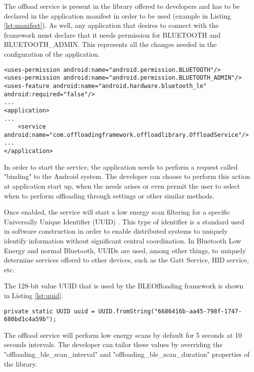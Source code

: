 The offload service is present in the library offered to developers and has to be declared in the application manifest in order to be used (example in Listing \ref{lst:manifest}). As well, any application that desires to connect with the framework must declare that it needs permission for BLUETOOTH and BLUETOOTH_ADMIN. This represents all the changes needed in the configuration of the application.

\pagebreak

\lstset{language=xml,caption=Example Application Manifest,label=lst:manifest}
\begin{lstlisting}
<uses-permission android:name="android.permission.BLUETOOTH"/>
<uses-permission android:name="android.permission.BLUETOOTH_ADMIN"/>
<uses-feature android:name="android.hardware.bluetooth_le" android:required="false"/>
...
<application>
...
	<service android:name="com.offloadingframework.offloadlibrary.OffloadService"/>
...
</application>
\end{lstlisting}


In order to start the service, the application needs to perform a request called "binding" to the Android system. The developer can choose to perform this action at application start up, when the needs arises or even permit the user to select when to perform offloading through settings or other similar methods.

Once enabled, the service will start a low energy scan filtering for a specific Universally Unique Identifier (UUID) . This type of identifier is a standard used in software construction in order to enable distributed systems to uniquely identify information without significant central coordination. In Bluetooth Low Energy and normal Bluetooth, UUIDs are used, among other things, to uniquely determine services offered to other devices, such as the Gatt Service, HID service, etc.

The 128-bit value UUID that is used by the BLEOffloading framework is shown in Listing \ref{lst:uuid}.

\lstset{language=java,caption=UUID used for discovery of Offloading Service, label=lst:uuid}
\begin{lstlisting}
private static UUID uuid = UUID.fromString("6686416b-aa45-798f-1747-680bd1c4a59b");
\end{lstlisting}


The offload service will perform low energy scans by default for 5 seconds at 10 seconds intervals. The developer can tailor these values by overriding the "offloading_ble_scan_interval" and "offloading_ble_scan_duration" properties of the library.

